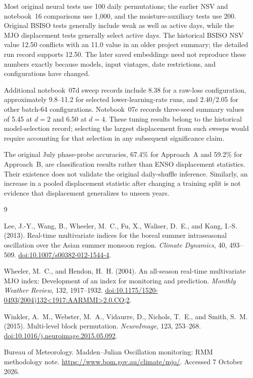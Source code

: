 \documentclass[11pt]{article}
\begin{document}
Most original neural tests use 100 daily permutations; the earlier NSV and notebook~16 comparisons use 1,000, and the moisture-auxiliary tests use 200. Original BSISO tests generally include weak as well as active days, while the MJO displacement tests generally select active days. The historical BSISO NSV value 12.50 conflicts with an 11.0 value in an older project summary; the detailed run record supports 12.50. The later saved embeddings need not reproduce these numbers exactly because models, input vintages, date restrictions, and configurations have changed.

Additional notebook~07d sweep records include 8.38 for a raw-loss configuration, approximately 9.8--11.2 for selected lower-learning-rate runs, and 2.40/2.05 for other batch-64 configurations. Notebook~07e records three-seed summary values of 5.45 at $d=2$ and 6.50 at $d=4$. These tuning results belong to the historical model-selection record; selecting the largest displacement from such sweeps would require accounting for that selection in any subsequent significance claim.

The original July phase-probe accuracies, 67.4\% for Approach~A and 59.2\% for Approach~B, are classification results rather than ENSO displacement statistics. Their existence does not validate the original daily-shuffle inference. Similarly, an increase in a pooled displacement statistic after changing a training split is not evidence that displacement generalizes to unseen years.

\begin{thebibliography}{9}

Lee, J.-Y., Wang, B., Wheeler, M.~C., Fu, X., Waliser, D.~E., and Kang, I.-S. (2013).
Real-time multivariate indices for the boreal summer intraseasonal oscillation over the Asian summer monsoon region.
\emph{Climate Dynamics}, 40, 493--509.
\href{https://doi.org/10.1007/s00382-012-1544-4}{doi:10.1007/s00382-012-1544-4}.

Wheeler, M.~C., and Hendon, H.~H. (2004).
An all-season real-time multivariate MJO index: Development of an index for monitoring and prediction.
\emph{Monthly Weather Review}, 132, 1917--1932.
\href{https://doi.org/10.1175/1520-0493(2004)132<1917:AARMMI>2.0.CO;2}{doi:10.1175/1520-0493(2004)132\textless1917:AARMMI\textgreater2.0.CO;2}.

Winkler, A.~M., Webster, M.~A., Vidaurre, D., Nichols, T.~E., and Smith, S.~M. (2015).
Multi-level block permutation.
\emph{NeuroImage}, 123, 253--268.
\href{https://doi.org/10.1016/j.neuroimage.2015.05.092}{doi:10.1016/j.neuroimage.2015.05.092}.

Bureau of Meteorology.
Madden--Julian Oscillation monitoring: RMM methodology note.
\url{https://www.bom.gov.au/climate/mjo/}.
Accessed 7 October 2026.

\end{thebibliography}
\end{document}
